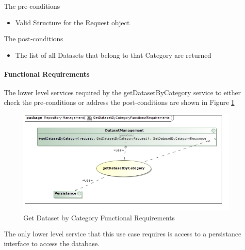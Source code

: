 The pre-conditions
\begin{itemize}
  \item Valid Structure for the Request object
\end{itemize}

The post-conditions
\begin{itemize}
  \item The list of all Datasets that belong to that Category are returned
\end{itemize}

\paragraph{Functional Requirements}
The lower level services required by the getDatasetByCategory service to either check the
pre-conditions or address the post-conditions are shown in Figure \ref{fig:getDatasetByCategoryFR}
\begin{figure}[H]
  \begin{center}
  \includegraphics[scale=0.6]{../Diagrams and Charts/Test Data/GetDatasetByCategoryFunctionalRequirements.jpg}
  \caption{Get Dataset by Category Functional Requirements}
  \label{fig:getDatasetByCategoryFR}
  \end{center}
\end{figure}

The only lower level service that this use case requires is access to
a persistance interface to access the database.

